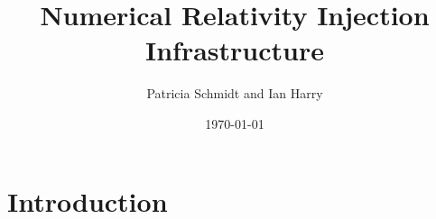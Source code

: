 \documentclass[a4paper, 11pt, titlepage]{article}
\begin{document}

\title{Numerical Relativity Injection Infrastructure}
\author{Patricia Schmidt and Ian Harry}
\date{\today}

\maketitle

\section{Introduction}
\label{sec:intro}

\end{document}
